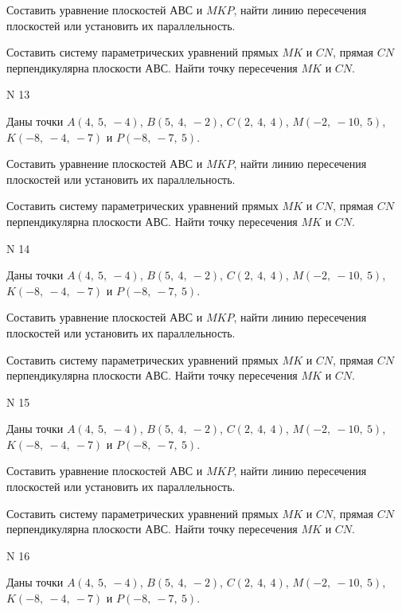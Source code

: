 \documentclass[11pt]{report}
\begin{document}
Составить уравнение плоскостей $АВС$ и $MKP$,
найти линию пересечения плоскостей или установить их параллельность.

Составить систему параметрических уравнений прямых $MK$ и $CN$,
прямая $CN$ перпендикулярна плоскости $АВС$. 
Найти точку пересечения $MK$ и $CN$.



 N 13

Даны точки $A\left( 4, \  5, \  -4\right)$, $B\left( 5, \  4, \  -2\right)$, $C\left( 2, \  4, \  4\right)$, $M\left( -2, \  -10, \  5\right)$, $K\left( -8, \  -4, \  -7\right)$ и $P\left( -8, \  -7, \  5\right)$.


Составить уравнение плоскостей $АВС$ и $MKP$,
найти линию пересечения плоскостей или установить их параллельность.

Составить систему параметрических уравнений прямых $MK$ и $CN$,
прямая $CN$ перпендикулярна плоскости $АВС$. 
Найти точку пересечения $MK$ и $CN$.



 N 14

Даны точки $A\left( 4, \  5, \  -4\right)$, $B\left( 5, \  4, \  -2\right)$, $C\left( 2, \  4, \  4\right)$, $M\left( -2, \  -10, \  5\right)$, $K\left( -8, \  -4, \  -7\right)$ и $P\left( -8, \  -7, \  5\right)$.


Составить уравнение плоскостей $АВС$ и $MKP$,
найти линию пересечения плоскостей или установить их параллельность.

Составить систему параметрических уравнений прямых $MK$ и $CN$,
прямая $CN$ перпендикулярна плоскости $АВС$. 
Найти точку пересечения $MK$ и $CN$.



 N 15

Даны точки $A\left( 4, \  5, \  -4\right)$, $B\left( 5, \  4, \  -2\right)$, $C\left( 2, \  4, \  4\right)$, $M\left( -2, \  -10, \  5\right)$, $K\left( -8, \  -4, \  -7\right)$ и $P\left( -8, \  -7, \  5\right)$.


Составить уравнение плоскостей $АВС$ и $MKP$,
найти линию пересечения плоскостей или установить их параллельность.

Составить систему параметрических уравнений прямых $MK$ и $CN$,
прямая $CN$ перпендикулярна плоскости $АВС$. 
Найти точку пересечения $MK$ и $CN$.



 N 16

Даны точки $A\left( 4, \  5, \  -4\right)$, $B\left( 5, \  4, \  -2\right)$, $C\left( 2, \  4, \  4\right)$, $M\left( -2, \  -10, \  5\right)$, $K\left( -8, \  -4, \  -7\right)$ и $P\left( -8, \  -7, \  5\right)$.
\end{document}
